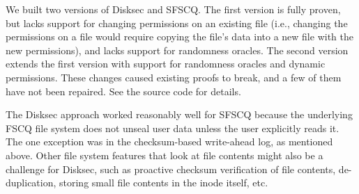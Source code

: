We built two versions of Disksec and SFSCQ.  The first version is fully
proven, but lacks support for changing permissions on an existing file
(i.e., changing the permissions on a file would require copying the
file's data into a new file with the new permissions), and lacks support
for randomness oracles.
The second version extends the first version with support for randomness
oracles and dynamic permissions.
These changes caused existing proofs to break, and a few of them have not
been repaired.
See the source code for details.

The Disksec approach worked reasonably well for SFSCQ because the underlying
FSCQ file system does not unseal user data unless the user explicitly
reads it.  The one exception was in the checksum-based write-ahead
log, as mentioned above.  Other file system features that look at file
contents might also be a challenge for Disksec, such as proactive checksum
verification of file contents, de-duplication, storing small file contents
in the inode itself, etc.
